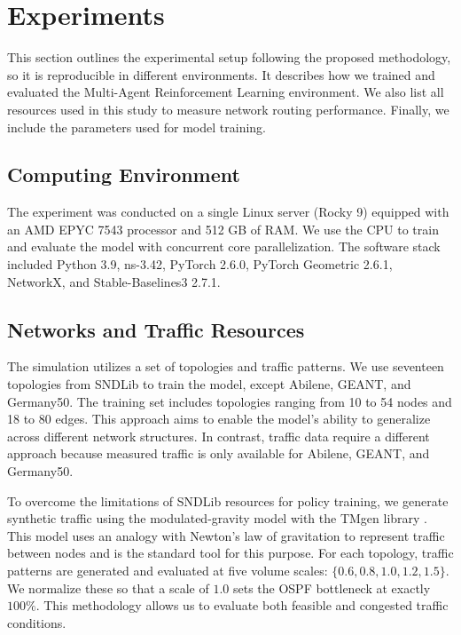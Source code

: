 \section{Experiments}


This section outlines the experimental setup following the proposed methodology, so it is reproducible in different environments. It describes how we trained and evaluated the Multi-Agent Reinforcement Learning environment. We also list all resources used in this study to measure network routing performance. Finally, we include the parameters used for model training. 

\subsection{Computing Environment}
\label{sec:setup-compute}

The experiment was conducted on a single Linux server (Rocky 9) equipped with an AMD EPYC 7543 processor and 512 GB of RAM. We use the CPU to train and evaluate the model with concurrent core parallelization. The software stack included Python 3.9, ns-3.42, PyTorch 2.6.0, PyTorch Geometric 2.6.1, NetworkX, and Stable-Baselines3 2.7.1. 

\subsection{Networks and Traffic Resources}
\label{sec:setup-instances}

The simulation utilizes a set of topologies and traffic patterns. We use seventeen topologies from SNDLib to train the model, except Abilene, GEANT, and Germany50. The training set includes topologies ranging from 10 to 54 nodes and 18 to 80 edges. This approach aims to enable the model’s ability to generalize across different network structures. In contrast, traffic data require a different approach because measured traffic is only available for Abilene, GEANT, and Germany50.

To overcome the limitations of SNDLib resources for policy training, we generate synthetic traffic using the modulated-gravity model with the TMgen library \citep{internet-traffic}. This model uses an analogy with Newton’s law of gravitation to represent traffic between nodes and is the standard tool for this purpose. For each topology,  traffic patterns are generated and evaluated at five volume scales: $\{0.6, 0.8, 1.0, 1.2, 1.5\}$. We normalize these so that a scale of $1.0$ sets the OSPF bottleneck at exactly $100\%$. This methodology allows us to evaluate both feasible and congested traffic conditions.

